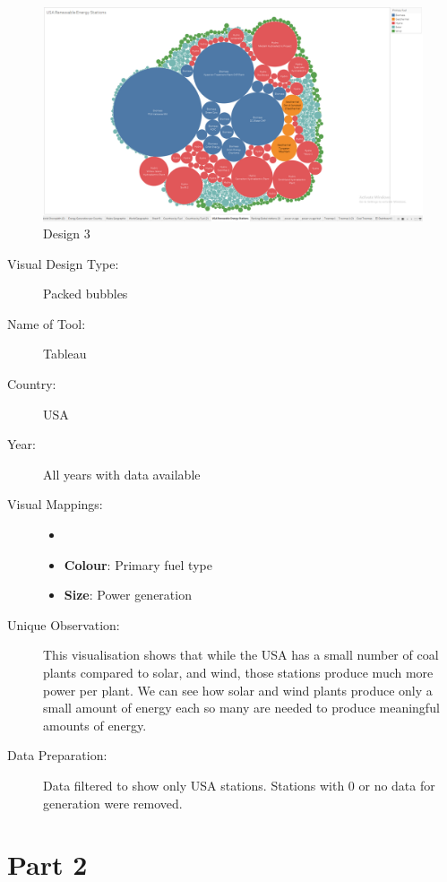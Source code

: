 \documentclass{article}
\begin{document}
\begin{figure}[ht]
\centering
\includegraphics[scale=0.3]{Packed-Bubbles.PNG}
\caption{Design 3}
\end{figure}

\begin{description}
\item[Visual Design Type:]
Packed bubbles
\item[Name of Tool:]
Tableau
\item[Country:]
USA
\item[Year:]
All years with data available
\item[Visual Mappings:]
\begin{itemize}
    \item[]
    \item \textbf{Colour}: Primary fuel type
    \item \textbf{Size}: Power generation
\end{itemize} 
\item[Unique Observation:]
This visualisation shows that while the USA has a small number of coal plants compared to solar, and wind, those stations produce much more power per plant.
We can see how solar and wind plants produce only a small amount of energy each so many are needed to produce meaningful amounts of energy.

\item[Data Preparation:]
Data filtered to show only USA stations. 
Stations with 0 or no data for generation were removed.
\end{description}


\section*{Part 2}
\end{document}
